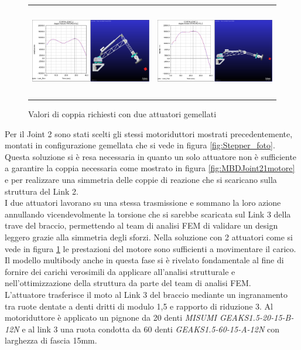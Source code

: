 \documentclass[%
corpo=11pt,
twoside,
 stile=classica,
oldstyle,
greek,%
]{toptesi}
\begin{document}
		\begin{figure} [!ht]
			\centering
			\begin{tabular}{ll}
				\includegraphics[height=4cm,keepaspectratio]{Plots/SPALLA/2motori/JOINT22favorevole.png}
				&
				\includegraphics[height=4cm,keepaspectratio]{Plots/SPALLA/2motori/JOINT22sfavorevole.png}
			\end{tabular}
			\caption{Valori di coppia richiesti con due attuatori gemellati}
			\label{fig:MBDJoint22motore}
		\end{figure}
		Per il Joint 2 sono stati scelti gli stessi motoriduttori mostrati precedentemente, montati in configurazione gemellata che si vede in figura \ref{fig:Stepper_foto}. \\
		Questa soluzione si è resa necessaria in quanto un solo attuatore non è sufficiente a garantire la coppia necessaria come mostrato in figura \ref{fig:MBDJoint21motore} e per realizzare una simmetria delle coppie di reazione che si scaricano sulla struttura del Link 2. \\
		I due attuatori lavorano su una stessa trasmissione e sommano la loro azione annullando vicendevolmente la torsione che si sarebbe scaricata sul Link 3 della trave del braccio, permettendo al team di analisi FEM di validare un design leggero grazie alla simmetria degli sforzi. Nella soluzione con 2 attuatori come si vede in figura \ref{fig:MBDJoint22motore} le prestazioni del motore sono sufficienti a movimentare il carico. \\
		Il modello multibody anche in questa fase si è rivelato fondamentale al fine di fornire dei carichi verosimili da applicare all'analisi strutturale e nell'ottimizzazione della struttura da parte del team di analisi FEM. 
		\\
		L'attuatore trasferisce il moto al Link 3 del braccio mediante un ingranamento tra ruote dentate a denti dritti di modulo 1,5 e rapporto di riduzione 3. Al motoriduttore è applicato un pignone da 20 denti \textit{MISUMI GEAKS1.5-20-15-B-12N} e al link 3 una ruota condotta da 60 denti \textit{GEAKS1.5-60-15-A-12N} con larghezza di fascia 15mm. \\
		
\end{document}
